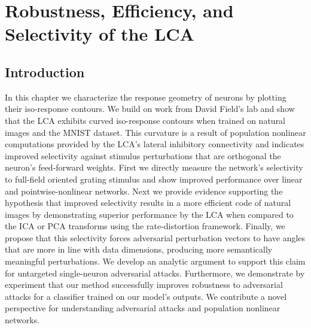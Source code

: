 \chapter{Robustness, Efficiency, and Selectivity of the LCA}

\section{Introduction}
In this chapter we characterize the response geometry of neurons by plotting their iso-response contours.
We build on work from David Field's lab \parencite{golden2016conjectures,vilankar2017selectivity} and show that the LCA exhibits curved iso-response contours when trained on natural images and the MNIST dataset.
This curvature is a result of population nonlinear computations provided by the LCA's lateral inhibitory connectivity and indicates improved selectivity against stimulus perturbations that are orthogonal the neuron's feed-forward weights.
First we directly measure the network's selectivity to full-field oriented grating stimulus and show improved performance over linear and pointwise-nonlinear networks.
Next we provide evidence supporting the hypothesis that improved selectivity results in a more efficient code of natural images by demonstrating superior performance by the LCA when compared to the ICA or PCA transforms using the rate-distortion framework.
Finally, we propose that this selectivity forces adversarial perturbation vectors to have angles that are more in line with data dimensions, producing more semantically meaningful perturbations.
We develop an analytic argument to support this claim for untargeted single-neuron adversarial attacks.
Furthermore, we demonstrate by experiment that our method successfully improves robustness to adversarial attacks for a classifier trained on our model's outputs.
We contribute a novel perspective for understanding adversarial attacks and population nonlinear networks. 

